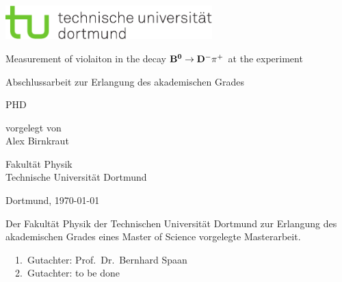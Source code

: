 
\begin{titlepage}
\includegraphics[width=8cm]{tud-logo-cmyk.pdf}
\vspace*{15ex}
{%
\Huge \sffamily \bfseries
\begin{center}
Measurement of  \CP violaiton in the decay $\mathbf{{{B}^0}\rightarrow{\ensuremath{{D}^-}}{\ensuremath{{\pi}^+}}}$ at the  \lhcb experiment
\end{center}
}%

\begin{otherlanguage}{german}
{%
\LARGE \sffamily %
\begin{center}
Abschlussarbeit zur Erlangung des akademischen Grades\\
\end{center}
}

{%
\LARGE \sffamily %
\begin{center}
PHD
\end{center}
}

\vspace{5ex}


{%
\Large \sffamily
\begin{center}
vorgelegt von \\[0.8ex]
Alex Birnkraut
\end{center}
}
\vspace{5ex}
{%
\Large \sffamily
\begin{center}
Fakultät Physik\\
Technische Universität Dortmund
\end{center}
}
\vspace{4ex}
{%
\Large \sffamily
\begin{center}
Dortmund, \today
\end{center}
}

\clearpage
\thispagestyle{empty}
\vspace*{\fill}
\noindent Der Fakultät Physik der Technischen Universität Dortmund zur Erlangung
des akademischen Grades eines Master of Science vorgelegte
Masterarbeit.\\

\parbox{\textwidth}{
  1.~Gutachter: Prof.~Dr.~Bernhard Spaan \\
  2.~Gutachter: to be done\\
}
\end{otherlanguage}
\end{titlepage}
\setcounter{page}{1}
